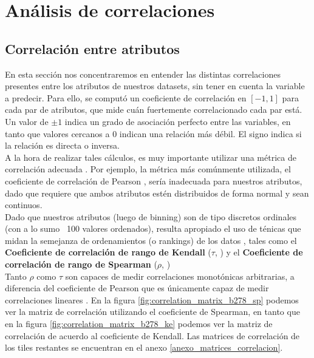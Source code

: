 \section{ Análisis de correlaciones }

\subsection{ Correlación entre atributos }

En esta sección nos concentraremos en entender las distintas correlaciones presentes entre los atributos de nuestros datasets, sin tener en cuenta la variable a predecir. Para ello, se computó un coeficiente de correlación en $[-1,1]$ para cada par de atributos, que mide cuán fuertemente correlacionado cada par está. Un valor de $\pm 1$ indica un grado de asociación perfecto entre las variables, en tanto que valores cercanos a $0$ indican una relación más débil. El signo indica si la relación es directa o inversa.  \\

A la hora de realizar tales cálculos, es muy importante utilizar una métrica de correlación adecuada \cite{how_to_choose_correlation}. Por ejemplo, la métrica más comúnmente utilizada, el coeficiente de correlación de Pearson \cite{pagano2010understanding}, sería inadecuada para nuestros atributos, dado que requiere que ambos atributos estén distribuidos de forma normal y sean continuos. \\

Dado que nuestros atributos (luego de binning) son de tipo discretos ordinales (con a lo sumo ~100 valores ordenados), resulta apropiado el uso de ténicas que midan la semejanza de ordenamientos (o rankings) de los datos  \cite{how_to_choose_correlation} \cite{pagano2010understanding}, tales como el \textbf{Coeficiente de correlación de rango de Kendall} ($\tau$, \cite{kendall_spearman}) y el \textbf{Coeficiente de correlación de rango de Spearman} ($\rho$, \cite{kendall_spearman}) \\

Tanto $\rho$ como $\tau$ son capaces de medir correlaciones monotónicas arbitrarias, a diferencia del coeficiente de Pearson que es únicamente capaz de medir correlaciones lineares \cite{pagano2010understanding}. En la figura \ref{fig:correlation_matrix_b278_sp} podemos ver la matriz de correlación utilizando el coeficiente de Spearman, en tanto que en la figura \ref{fig:correlation_matrix_b278_ke} podemos ver la matriz de correlación de acuerdo al coeficiente de Kendall. Las matrices de correlación de los tiles restantes se encuentran en el anexo \ref{anexo_matrices_correlacion}. \\

